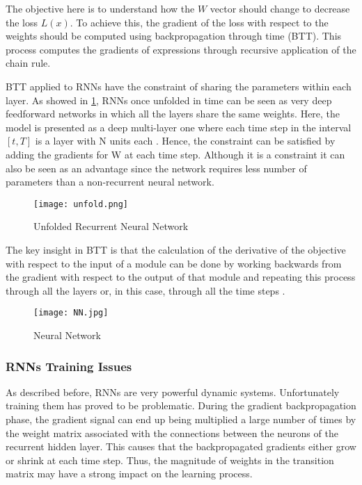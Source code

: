 The objective here is to understand how the $W$ vector should change to decrease the loss $L(x)$. To achieve this, the gradient of the loss with respect to the weights should be computed using backpropagation through time (BTT). This process computes the gradients of expressions through recursive application of the chain rule. 

BTT applied to RNNs have the constraint of sharing the parameters within each layer. As showed in  \ref{fig:unfold}, RNNs once unfolded in time can be seen as very deep feedforward networks in which all the layers share the same weights\cite{lecun2015deep}. Here, the model is presented as a deep multi-layer one where each time step in the interval $[t,T]$ is a layer with N units each \cite{pascanu2013difficulty}. Hence, the constraint can be satisfied by adding the gradients for W at each time step. Although it is a constraint it can also be seen as an advantage since the network requires less number of parameters than a non-recurrent neural network.

\begin{figure}
\label{fig:unfold}
\center
\texttt{[image: unfold.png]}
\caption{Unfolded Recurrent Neural Network}
\end{figure}

The key insight in BTT is that the calculation of the derivative of the objective with respect to the input of a module can be done by working backwards from the gradient with respect to the output of that module and repeating this process through all the layers or, in this case, through all the time steps \cite{schmidhuber2015deep}.

\begin{figure}
\label{fig:bpt}
\center
\texttt{[image: NN.jpg]}
\caption{Neural Network}
\end{figure}

\subsubsection{RNNs Training Issues}
As described before, RNNs are very powerful dynamic systems. Unfortunately training them has proved to be problematic. During the gradient backpropagation phase, the gradient signal can end up being multiplied a large number of times by the weight matrix associated with the connections between the neurons of the recurrent hidden layer. This causes that the backpropagated gradients either grow or shrink at each time step. Thus, the magnitude of weights in the transition matrix may have a strong impact on the learning process.

